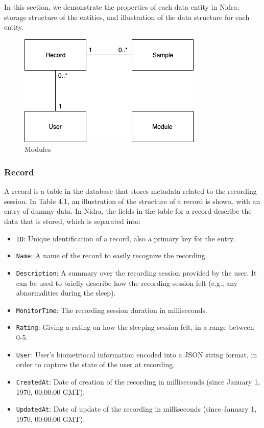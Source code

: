 In this section, we demonstrate the properties of each data entity in Nidra; storage structure of the entities, and illustration of the data structure for each entity.  

\begin{figure}
    \centering
    \includegraphics[scale=0.6]{images/DataEntries.png}
    \caption{Modules}
    \label{fig:dataentries}
\end{figure}

\subsubsection{Record} \label{ssec:record}

A record is a table in the database that stores metadata related to the recording session. In Table 4.1, an illustration of the structure of a record is shown, with an entry of dummy data. In Nidra, the fields in the table for a record describe the data that is stored, which is separated into:
\begin{itemize}
	\item \verb|ID|: Unique identification of a record, also a primary key for the entry.
	\item \verb|Name|: A name of the record to easily recognize the recording.
	\item \verb|Description|: A summary over the recording session provided by the user. It can be used to briefly describe how the recording session felt (e.g., any abnormalities during the sleep).
	\item \verb|MonitorTime|: The recording session duration in milliseconds.
	\item \verb|Rating|: Giving a rating on how the sleeping session felt, in a range between 0-5. 
	\item \verb|User|: User's biometriocal information encoded into a JSON string format, in order to capture the state of the user at recording. 
	\item \verb|CreatedAt|: Date of creation of the recording in milliseconds (since January 1, 1970, 00:00:00 GMT).
	\item \verb|UpdatedAt|: Date of update of the recording in milliseconds (since January 1, 1970, 00:00:00 GMT).
\end{itemize}



